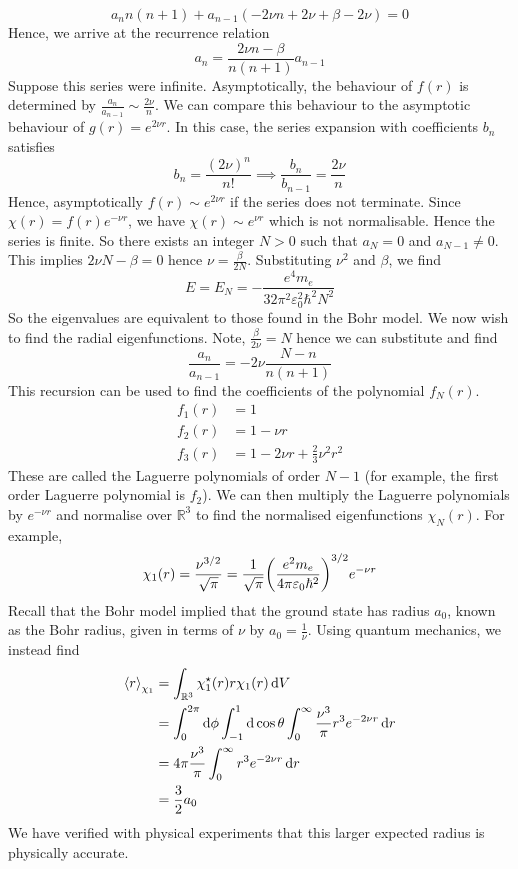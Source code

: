 \[
	a_n n(n+1) + a_{n-1} (-2 \nu n + 2 \nu + \beta - 2 \nu) = 0
\]
Hence, we arrive at the recurrence relation
\[
	a_n = \frac{2\nu n - \beta}{n(n+1)} a_{n-1}
\]
Suppose this series were infinite.
Asymptotically, the behaviour of \( f(r) \) is determined by \( \frac{a_n}{a_{n-1}} \sim \frac{2\nu}{n} \).
We can compare this behaviour to the asymptotic behaviour of \( g(r) = e^{2\nu r} \).
In this case, the series expansion with coefficients \( b_n \) satisfies
\[
	b_n = \frac{(2\nu)^n}{n!} \implies \frac{b_n}{b_{n-1}} = \frac{2 \nu}{n}
\]
Hence, asymptotically \( f(r) \sim e^{2 \nu r} \) if the series does not terminate.
Since \( \chi(r) = f(r) e^{-\nu r} \), we have \( \chi(r) \sim e^{\nu r} \) which is not normalisable.
Hence the series is finite.
So there exists an integer \( N > 0 \) such that \( a_N = 0 \) and \( a_{N-1} \neq 0 \).
This implies \( 2 \nu N - \beta = 0 \) hence \( \nu = \frac{\beta}{2N} \).
Substituting \( \nu^2 \) and \( \beta \), we find
\[
	E = E_N = -\frac{e^4 m_e}{32 \pi^2 \varepsilon_0^2 \hbar^2 N^2}
\]
So the eigenvalues are equivalent to those found in the Bohr model.
We now wish to find the radial eigenfunctions.
Note, \( \frac{\beta}{2\nu} = N \) hence we can substitute and find
\[
	\frac{a_n}{a_{n-1}} = -2 \nu \frac{N - n}{n(n+1)}
\]
This recursion can be used to find the coefficients of the polynomial \( f_N(r) \).
\begin{align*}
	f_1(r) & = 1                                   \\
	f_2(r) & = 1 - \nu r                           \\
	f_3(r) & = 1 - 2 \nu r + \frac{2}{3} \nu^2 r^2
\end{align*}
These are called the Laguerre polynomials of order \( N-1 \) (for example, the first order Laguerre polynomial is \( f_2 \)).
We can then multiply the Laguerre polynomials by \( e^{-\nu r} \) and normalise over \( \mathbb R^3 \) to find the normalised eigenfunctions \( \chi_N(r) \).
For example,
\[
	\chi_1(r) = \frac{\nu^{3/2}}{\sqrt{\pi}} = \frac{1}{\sqrt{\pi}} \qty(\frac{e^2 m_e}{4 \pi \varepsilon_0 \hbar^2})^{3/2} e^{-\nu r}
\]
Recall that the Bohr model implied that the ground state has radius \( a_0 \), known as the Bohr radius, given in terms of \( \nu \) by \( a_0 = \frac{1}{\nu} \).
Using quantum mechanics, we instead find
\begin{align*}
	\left\langle{r}\right\rangle_{\chi_1} & = \int_{\mathbb R^3} \chi_1^\star(r) r \chi_1(r) \dd{V}                                                       \\
	                   & = \int_0^{2\pi} \dd{\phi} \int_{-1}^1 \dd{\cos \theta} \int_0^\infty \frac{\nu^3}{\pi} r^3 e^{-2\nu r} \dd{r} \\
	                   & = 4\pi \frac{\nu^3}{\pi} \int_0^\infty r^3 e^{-2\nu r} \dd{r}                                                 \\
	                   & = \frac{3}{2} a_0
\end{align*}
We have verified with physical experiments that this larger expected radius is physically accurate.


